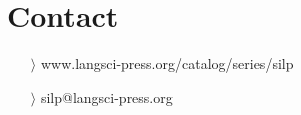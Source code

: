 \documentclass[
notumble,
nofoldmark,
]{leaflet}
\begin{document}
{{    \section{\color{LIGHTGRAY} \sffamily \Large Contact} 
	\begin{itemize}
	  \item[$\rangle$] \sffamily www.langsci-press.org/catalog/series/silp
	  \item[$\rangle$]\sffamily  silp@langsci-press.org 
	\end{itemize} 
  }
}

\usebox{\pageone}

\newpage

\usebox{\pagetwo}

\newpage

\usebox{\pagetwo}

\newpage

\usebox{\pagetwo}

\newpage

\usebox{\pageone}

\newpage

\usebox{\pageone}
 

\loggingall
\end{document}
